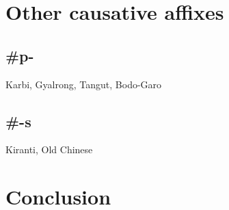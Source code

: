 \documentclass[oldfontcommands,oneside,a4paper,11pt]{article}
\begin{document}
\section{Other causative affixes}
\subsection{\#p-}
Karbi, Gyalrong, Tangut, Bodo-Garo

\citet{jacques15causative}
\citet{konnerth15cisloc}
\citet{delancey15adjectival}
\citet{jackson14morpho}
\citet{jackson06paisheng}

\subsection{\#-s}
Kiranti, Old Chinese
\citet{michailovsky85dental}
\citet{jacques15derivational.khaling}
\section{Conclusion}
 


\end{document}
